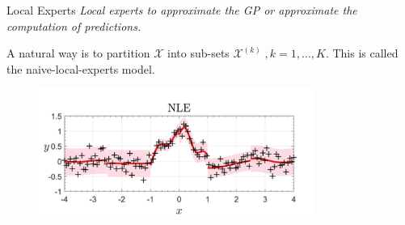 \begin{frame}{Local Experts}
\textit{Local experts to approximate the GP or approximate the computation of predictions.}

A natural way is to partition $\mathcal{X}$ into sub-sets $\mathcal{X}^{(k)} \; , k=1, \dots, K$. This is called the naive-local-experts model.
\begin{figure}
  \includegraphics[width=0.8\textwidth]{NLE}
\end{figure}
\end{frame}


